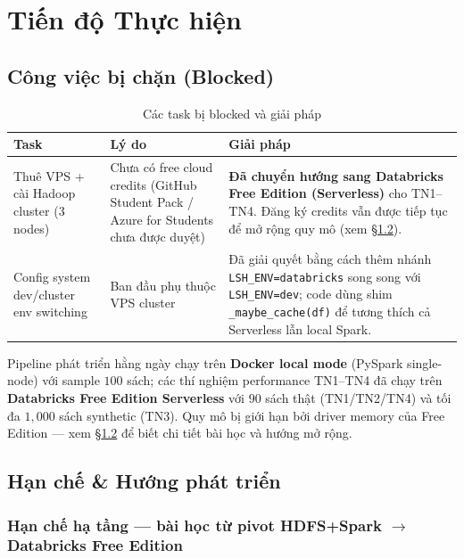 \newpage
\section{Tiến độ Thực hiện}
\label{sec:plan}

\subsection{Công việc bị chặn (Blocked)}

\begin{table}[H]
\centering
\caption{Các task bị blocked và giải pháp}
\begin{tabularx}{\textwidth}{X X X}
\toprule
\textbf{Task} & \textbf{Lý do} & \textbf{Giải pháp} \\
\midrule
Thuê VPS + cài Hadoop cluster (3 nodes) & Chưa có free cloud credits (GitHub Student Pack / Azure for Students chưa được duyệt) & \textbf{Đã chuyển hướng sang Databricks Free Edition (Serverless)} cho TN1--TN4. Đăng ký credits vẫn được tiếp tục để mở rộng quy mô (xem \S\ref{subsec:limitations-future}). \\
\midrule
Config system dev/cluster env switching & Ban đầu phụ thuộc VPS cluster & Đã giải quyết bằng cách thêm nhánh \texttt{LSH\_ENV=databricks} song song với \texttt{LSH\_ENV=dev}; code dùng shim \texttt{\_maybe\_cache(df)} để tương thích cả Serverless lẫn local Spark. \\
\bottomrule
\end{tabularx}
\end{table}

Pipeline phát triển hằng ngày chạy trên \textbf{Docker local mode} (PySpark single-node) với sample $100$ sách; các thí nghiệm performance TN1--TN4 đã chạy trên \textbf{Databricks Free Edition Serverless} với $90$ sách thật (TN1/TN2/TN4) và tối đa $1{,}000$ sách synthetic (TN3). Quy mô bị giới hạn bởi driver memory của Free Edition --- xem \S\ref{subsec:limitations-future} để biết chi tiết bài học và hướng mở rộng.

\subsection{Hạn chế \& Hướng phát triển}
\label{subsec:limitations-future}

\subsubsection{Hạn chế hạ tầng --- bài học từ pivot HDFS+Spark $\rightarrow$ Databricks Free Edition}

